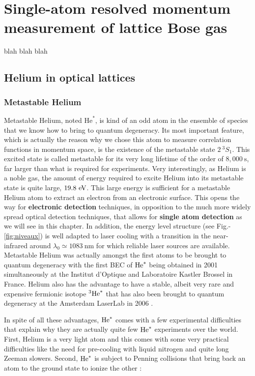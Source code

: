 \chapter{Single-atom resolved momentum measurement of lattice Bose gas}

\label{sec:chapter_3}

blah blah blah

\section{Helium in optical lattices}

\subsection{Metastable Helium}

Metastable Helium, noted $\mathrm{He}^*$, is kind of an odd atom in the ensemble of species that we know how to bring to quantum degeneracy. Its most important feature, which is actually the reason why we chose this atom to measure correlation functions in momentum space, is the existence of the metastable state $2 \ ^3 S_1$. This excited state is called metastable for its very long lifetime of the order of $8,000 \ \mathrm{s}$, far larger than what is required for experiments. Very interestingly, as Helium is a noble gas, the amount of energy required to excite Helium into its metastable state is quite large, $19.8 \ \rm{eV}$. This large energy is sufficient for a metastable Helium atom to extract an electron from an electronic surface. This opens the way for \textbf{electronic detection} techniques, in opposition to the much more widely spread optical detection techniques, that allows for \textbf{single atom detection} as we will see in this chapter. In addition, the energy level structure (see Fig.-\ref{fig:niveaux}) is well adapted to laser cooling with a transition in the near-infrared around $\lambda_0 \simeq 1083 \ \mathrm{nm}$ for which reliable laser sources are available. Metastable Helium was actually amongst the first atoms to be brought to quantum degeneracy with the first BEC of $\mathrm{He}^*$ being obtained in 2001 simultaneously at the Institut d'Optique \cite{robert2001bose} and Laboratoire Kastler Brossel \cite{dos2001bose} in France. Helium also has the advantage to have a stable, albeit very rare and expensive fermionic isotope $^3 \mathrm{He}^*$ that has also been brought to quantum degeneracy at the Amsterdam LaserLab in 2006 \cite{mcnamara2006degenerate}.

In spite of all these advantages, $\mathrm{He}^*$ comes with a few experimental difficulties that explain why they are actually quite few $\mathrm{He}^*$ experiments over the world. First, Helium is a very light atom and this comes with some very practical difficulties like the need for pre-cooling with liquid nitrogen and quite long Zeeman slowers. Second, $\mathrm{He}^*$ is subject to Penning collisions that bring back an atom to the ground state to ionize the other \cite{dos2001penning}:

